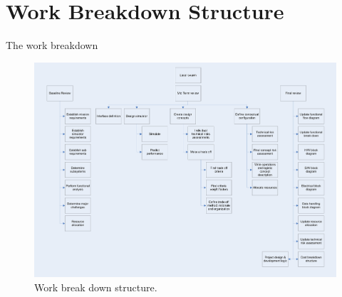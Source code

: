 \section{Work Breakdown Structure}
\label{dsePPWBS}
The work breakdown

\newpage
\begin{figure}
\begin{center}
\includegraphics[width=1.2\textwidth, angle=90]{chapters/img/Work_break_down_structure.jpg}
\end{center}
\caption{Work break down structure.}
\end{figure}
